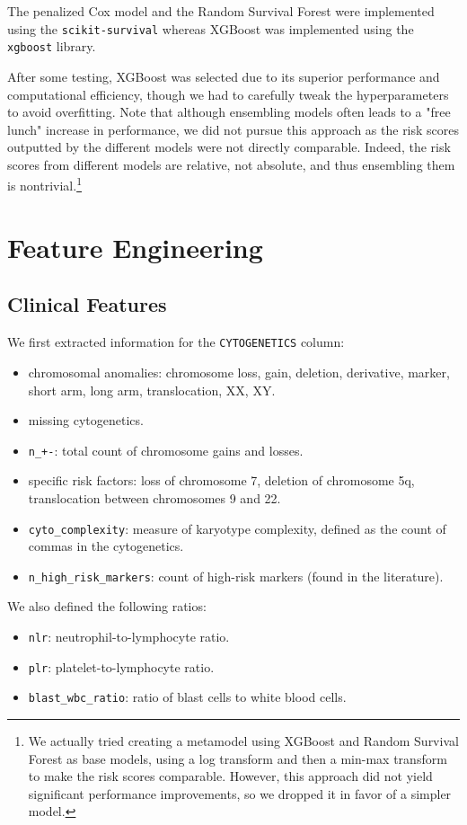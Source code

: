 \documentclass{article}
\begin{document}
The penalized Cox model and the Random Survival Forest were implemented using the \texttt{scikit-survival} whereas XGBoost was implemented using the \texttt{xgboost} library.

After some testing, XGBoost was selected due to its superior performance and computational efficiency, though we had to carefully tweak the hyperparameters to avoid overfitting. Note that although ensembling models often leads to a "free lunch" increase in performance, we did not pursue this approach as the risk scores outputted by the different models were not directly comparable. Indeed, the risk scores from different models are relative, not absolute, and thus ensembling them is nontrivial.\footnote{We actually tried creating a metamodel using XGBoost and Random Survival Forest as base models, using a log transform and then a min-max transform to make the risk scores comparable. However, this approach did not yield significant performance improvements, so we dropped it in favor of a simpler model.}

\section{Feature Engineering}
\subsection{Clinical Features}
We first extracted information for the \texttt{CYTOGENETICS} column:
\begin{itemize}
    \item chromosomal anomalies: chromosome loss, gain, deletion, derivative, marker, short arm, long arm, translocation, XX, XY.
    \item missing cytogenetics.
    \item \texttt{n\_+-}: total count of chromosome gains and losses.
    \item specific risk factors:  loss of chromosome 7, deletion of chromosome 5q, translocation between chromosomes 9 and 22.
    \item \texttt{cyto\_complexity}: measure of karyotype complexity, defined as the count of commas in the cytogenetics.
    \item \texttt{n\_high\_risk\_markers}: count of high-risk markers (found in the literature).
\end{itemize}

We also defined the following ratios:
\begin{itemize}
    \item \texttt{nlr}: neutrophil-to-lymphocyte ratio.
    \item \texttt{plr}: platelet-to-lymphocyte ratio.
    \item \texttt{blast\_wbc\_ratio}: ratio of blast cells to white blood cells.
\end{itemize}
\end{document}
